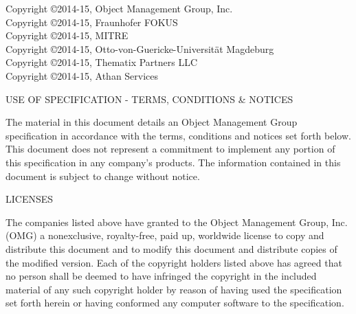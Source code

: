 \documentclass[10pt, a4paper]{isov2}
\newcommand{\OMGparagraph}[1]{
\vspace{23pt}
{\centerline {#1}}
\vspace{3pt}
}
\begin{document}



\thispagestyle{empty}
\clearpage

  

\noindent Copyright \copyright 2014-15, Object Management Group, Inc.\\
Copyright \copyright 2014-15, Fraunhofer FOKUS\\
Copyright \copyright 2014-15, MITRE\\
Copyright \copyright 2014-15, Otto-von-Guericke-Universit{\"a}t Magdeburg  \\
Copyright \copyright 2014-15, Thematix Partners LLC \\
Copyright \copyright 2014-15, Athan Services \\



\OMGparagraph{USE OF SPECIFICATION - TERMS, CONDITIONS \& NOTICES}
The material in this document details an Object Management Group specification in accordance with
 the terms, conditions and notices set forth below. This document does not represent a commitment
  to implement any portion of this specification in any company's products. The information
   contained in this document is subject to change without notice.


\OMGparagraph{LICENSES}
The companies listed above have granted to the Object Management Group, Inc. (OMG) a nonexclusive,
 royalty-free, paid up, worldwide license to copy and distribute this document and to modify this 
  document and distribute copies of the modified version. Each of the copyright holders listed 
   above has agreed that no person shall be deemed to have infringed the copyright in the included 
    material of any such copyright holder by reason of having used the specification set forth 
	 herein or having conformed any computer software to the specification.
\end{document}
